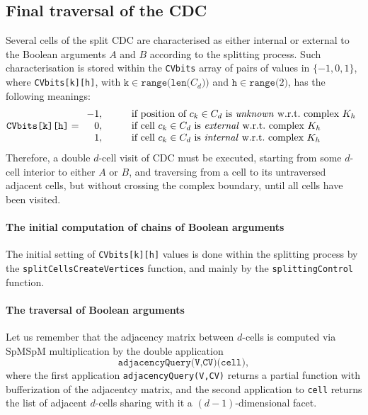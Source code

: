 \documentclass[11pt,oneside]{article}	%
\begin{document}
\subsection{Final traversal of the CDC}

Several cells of the split CDC are characterised as either internal or external to the Boolean arguments $A$ and $B$ according to the splitting process. Such characterisation is stored within the \texttt{CVbits} array of pairs of values in $\{ -1,0,1\}$, where \texttt{CVbits[k][h]}, with $\texttt{k}\in\texttt{range(len(}C_d\texttt{))}$ and $\texttt{h}\in \texttt{range(}2\texttt{)}$, has the following meanings: 
\[
\texttt{CVbits[k][h]} = 
\begin{array}{rcl}
-1, &\quad & \mbox{if position of\ } c_k\in C_d \mbox{\ is \emph{unknown} w.r.t.~complex\ }K_h \\ 
0, &\quad & \mbox{if cell\ }c_k\in C_d \mbox{\ is \emph{external} w.r.t.~complex\ }K_h \\ 
1,  &\quad & \mbox{if cell\ }c_k\in C_d \mbox{\ is \emph{internal} w.r.t.~complex\ }K_h 
\end{array}
\]
Therefore, a double $d$-cell visit of CDC must be executed, starting from some $d$-cell interior to either $A$ or $B$, and traversing from a cell to its untraversed adjacent cells, but without crossing the complex boundary, until all cells have been visited. 

\paragraph{The initial computation of chains of Boolean arguments}

The initial setting of \texttt{CVbits[k][h]} values is done within the splitting process by the \texttt{splitCellsCreateVertices} function, and mainly by the \texttt{splittingControl} function.

\paragraph{The traversal of Boolean arguments}
Let us remember that the adjacency matrix between $d$-cells is computed via SpMSpM multiplication by the double application 
\[
\texttt{adjacencyQuery(V,CV)(cell)}, 
\] 
where the first application \texttt{adjacencyQuery(V,CV)}
returns a partial function with bufferization of the adjacentcy matrix, and the second application to \texttt{cell} returns the list of adjacent $d$-cells sharing with it a $(d-1)$-dimensional facet.
\end{document}
